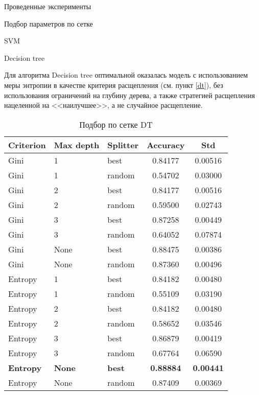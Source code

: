 \begin{section}{Проведенные эксперименты}
\begin{subsection}{Подбор параметров по сетке}
\begin{subsubsection}{SVM}
\end{subsubsection}

\begin{subsubsection}{Decision tree}

Для алгоритма Decision tree оптимальной оказалась модель с использованием меры энтропии в качестве критерия расщепления (см. пункт \ref{dt}), без использования ограничений на глубину дерева, а также стратегией расщепления нацеленной на <<наилучшее>>, а не случайное расщепление.


\begin{table}[H]
\centering
{\begin{tabular}{|l|l|l|c|c|}
\hline
\textbf{Criterion} & \textbf{Max depth} & \textbf{Splitter} & \textbf{Accuracy} & \textbf{Std} \\
\hline
Gini & 1  & best & 0.84177 & 0.00516 \\
\hline
Gini & 1  & random &  0.54702 & 0.03000 \\
\hline
Gini & 2  & best & 0.84177 & 0.00516 \\
\hline
Gini &  2 & random  & 0.59500 & 0.02743 \\
\hline
Gini & 3  & best & 0.87258 & 0.00449 \\
\hline
Gini & 3  & random & 0.64052 & 0.07874 \\
\hline
Gini & None  & best & 0.88475 & 0.00386 \\
\hline
Gini &  None & random  & 0.87360 & 0.00496 \\
\hline
Entropy & 1  & best & 0.84182 & 0.00480 \\
\hline
Entropy & 1  & random & 0.55109 & 0.03190 \\
\hline
Entropy  & 2  & best & 0.84182 & 0.00480 \\
\hline
Entropy  &  2 & random  & 0.58652 & 0.03546 \\
\hline
Entropy  & 3  & best &  0.86879 & 0.00419 \\
\hline
Entropy  & 3  & random & 0.67764 & 0.06590 \\
\hline
\textbf{Entropy} & \textbf{None}  & \textbf{best} & \textbf{0.88884} & \textbf{0.00441} \\
\hline
Entropy &  None & random  & 0.87409 & 0.00369 \\
\hline
\end{tabular}}

\caption{Подбор по сетке DT}
\label{grid:dt}
\end{table}


\end{subsubsection}



\end{subsection}
\end{section}
